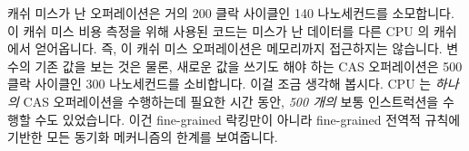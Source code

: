 캐쉬 미스가 난 오퍼레이션은 거의 200 클락 사이클인 140 나노세컨드를 소모합니다.
이 캐쉬 미스 비용 측정을 위해 사용된 코드는 미스가 난 데이터를 다른 CPU 의
캐쉬에서 얻어옵니다. 즉, 이 캐쉬 미스 오퍼레이션은 메모리까지 접근하지는
않습니다.
변수의 기존 값을 보는 것은 물론, 새로운 값을 쓰기도 해야 하는 CAS 오퍼레이션은
500 클락 사이클인 300 나노세컨드를 소비합니다.
이걸 조금 생각해 봅시다.
CPU 는 \emph{하나의} CAS 오퍼레이션을 수행하는데 필요한 시간 동안, \emph{500
개의} 보통 인스트럭션을 수행할 수도 있었습니다.
이건 fine-grained 락킹만이 아니라 fine-grained 전역적 규칙에 기반한 모든 동기화
메커니즘의 한계를 보여줍니다.

